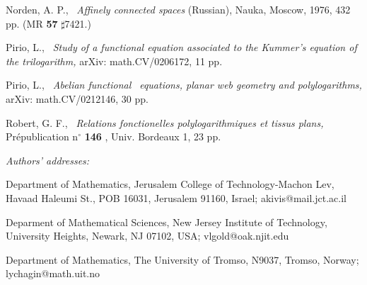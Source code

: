 \documentclass{article}
\begin{document}
\begin{thebibliography}{99}
 Norden, A. P., \ \emph{Affinely connected spaces} (Russian),
Nauka, Moscow, 1976, 432 pp. (MR \textbf{57} $\sharp $7421.)

 Pirio, L., \emph{\ Study of a functional equation associated
to the Kummer's equation of the trilogarithm, } arXiv: math.CV/0206172, 11
pp.

 Pirio, L., \emph{\ Abelian functional}\textit{\ }\emph{%
equations, planar web geometry and polylogarithms, } arXiv: math.CV/0212146,
30 pp.

 Robert, G. F., \emph{\ Relations fonctionelles
polylogarithmiques et tissus plans, }Pr\'{e}publication n$^{\circ }$ \textbf{%
146} , Univ. Bordeaux 1, 23 pp.
\end{thebibliography}

\bigskip

\bigskip

\emph{Authors' addresses:}

Department of Mathematics, Jerusalem College of Technology-Machon Lev,
Havaad Haleumi St., POB 16031, Jerusalem 91160, Israel; akivis@mail.jct.ac.il

Deparment of Mathematical Sciences, New Jersey Institute of Technology,
University Heights, Newark, NJ 07102, USA; vlgold@oak.njit.edu

Department of Mathematics, The University of Tromso, N9037, Tromso, Norway;
lychagin@math.uit.no
\end{document}
